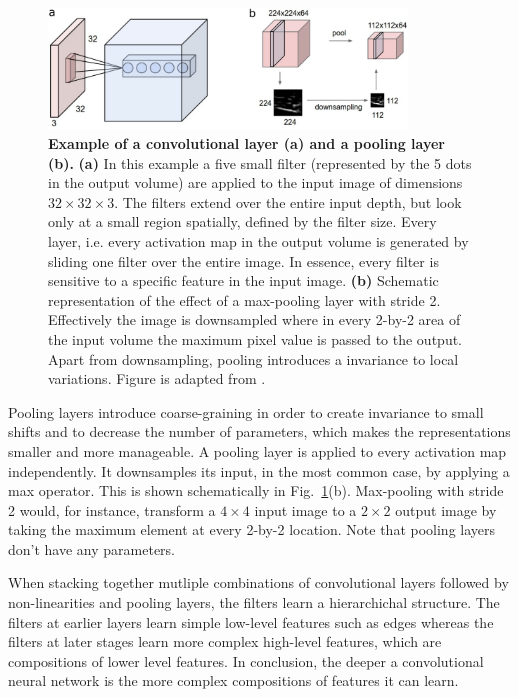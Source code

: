 \begin{figure}[h!]
	\centering
	\captionsetup{width=1\linewidth}
	\includegraphics[width=0.85\textwidth]{Figures/conv_pooling.pdf}
	\caption{\textbf{Example of a convolutional layer (a) and a pooling layer (b).} \textbf{(a)} In this example a five small filter (represented by the 5 dots in the output volume) are applied to the input image of dimensions $32\times32\times3$. The filters extend over the entire input depth, but look only at a small region spatially, defined by the filter size. Every layer, i.e. every activation map in the output volume is generated by sliding one filter over the entire image. In essence, every filter is sensitive to a specific feature in the input image. \textbf{(b)} Schematic representation of the effect of a max-pooling layer with stride 2. Effectively the image is downsampled where in every 2-by-2 area of the input volume the maximum pixel value is passed to the output. Apart from downsampling, pooling introduces a invariance to local variations. Figure is adapted from \parencite{cs231}.
}
	\label{fig:conv_pooling}
\end{figure}

Pooling layers introduce coarse-graining in order to create invariance to small shifts and to decrease the number of parameters, which makes the representations smaller and more manageable. A pooling layer is applied to every activation map independently. It downsamples its input, in the most common case, by applying a max operator. This is shown schematically in Fig.~\ref{fig:conv_pooling}(b). Max-pooling with stride 2 would, for instance, transform a $4 \times 4$ input image to a $2 \times 2$ output image by taking the maximum element at every 2-by-2 location. Note that pooling layers don't have any parameters.

When stacking together mutliple combinations of convolutional layers followed by non-linearities and pooling layers, the filters learn a hierarchichal structure. The filters at earlier layers learn simple low-level features such as edges whereas the filters at later stages learn more complex high-level features, which are compositions of lower level features. In conclusion, the deeper a convolutional neural network is the more complex compositions of features it can learn.


